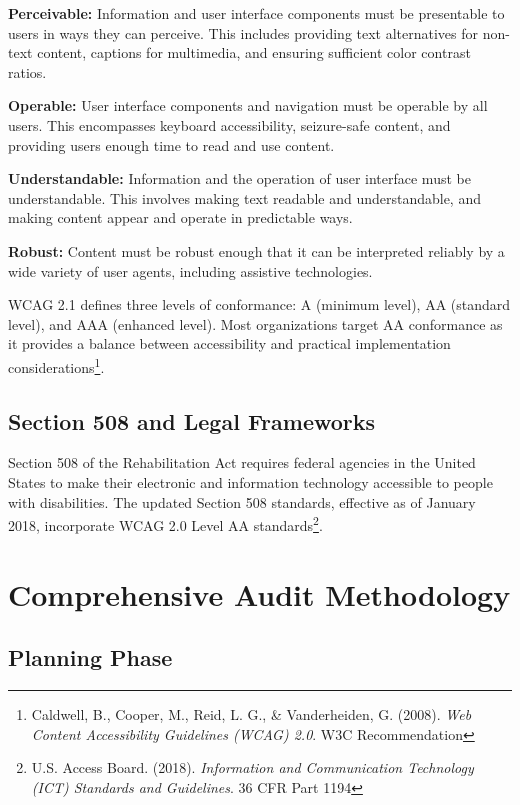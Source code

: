 \textbf{Perceivable:} Information and user interface components must be presentable to users in ways they can perceive. This includes providing text alternatives for non-text content, captions for multimedia, and ensuring sufficient color contrast ratios.

\textbf{Operable:} User interface components and navigation must be operable by all users. This encompasses keyboard accessibility, seizure-safe content, and providing users enough time to read and use content.

\textbf{Understandable:} Information and the operation of user interface must be understandable. This involves making text readable and understandable, and making content appear and operate in predictable ways.

\textbf{Robust:} Content must be robust enough that it can be interpreted reliably by a wide variety of user agents, including assistive technologies.

WCAG 2.1 defines three levels of conformance: A (minimum level), AA (standard level), and AAA (enhanced level). Most organizations target AA conformance as it provides a balance between accessibility and practical implementation considerations\footnote{Caldwell, B., Cooper, M., Reid, L. G., \& Vanderheiden, G. (2008). \textit{Web Content Accessibility Guidelines (WCAG) 2.0}. W3C Recommendation}.

\subsection{Section 508 and Legal Frameworks}

Section 508 of the Rehabilitation Act requires federal agencies in the United States to make their electronic and information technology accessible to people with disabilities. The updated Section 508 standards, effective as of January 2018, incorporate WCAG 2.0 Level AA standards\footnote{U.S. Access Board. (2018). \textit{Information and Communication Technology (ICT) Standards and Guidelines}. 36 CFR Part 1194}.

\section{Comprehensive Audit Methodology}
\label{sec:audit-methodology}

\subsection{Planning Phase}

